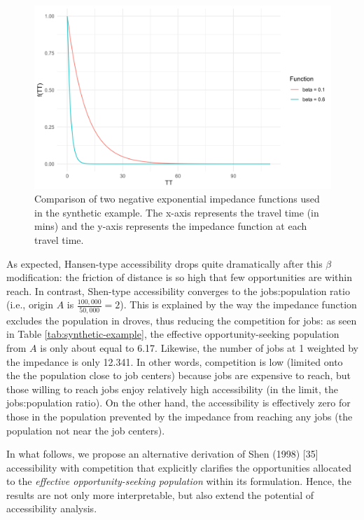 \documentclass[10pt,letterpaper]{article}
\begin{document}
\begin{figure}
\includegraphics[width=1\linewidth]{images/Fig2} \caption{\label{fig:Fig2}Comparison of two negative exponential impedance functions used in the synthetic example. The x-axis represents the travel time (in mins) and the y-axis represents the impedance function at each travel time.}\label{fig:comparison-impedance-functions-synthetic-example}
\end{figure}

As expected, Hansen-type accessibility drops quite dramatically after
this \(\beta\) modification: the friction of distance is so high that
few opportunities are within reach. In contrast, Shen-type accessibility
converges to the jobs:population ratio (i.e., origin \(A\) is
\(\frac{100,000}{50,000} = 2\)). This is explained by the way the
impedance function excludes the population in droves, thus reducing the
competition for jobs: as seen in Table \ref{tab:synthetic-example}, the
effective opportunity-seeking population from \(A\) is only about equal
to 6.17. Likewise, the number of jobs at 1 weighted by the impedance is
only 12.341. In other words, competition is low (limited onto the the
population close to job centers) because jobs are expensive to reach,
but those willing to reach jobs enjoy relatively high accessibility (in
the limit, the jobs:population ratio). On the other hand, the
accessibility is effectively zero for those in the population prevented
by the impedance from reaching any jobs (the population not near the job
centers).

In what follows, we propose an alternative derivation of Shen (1998)
{[}35{]} accessibility with competition that explicitly clarifies the
opportunities allocated to the \emph{effective opportunity-seeking
population} within its formulation. Hence, the results are not only more
interpretable, but also extend the potential of accessibility analysis.
\end{document}
